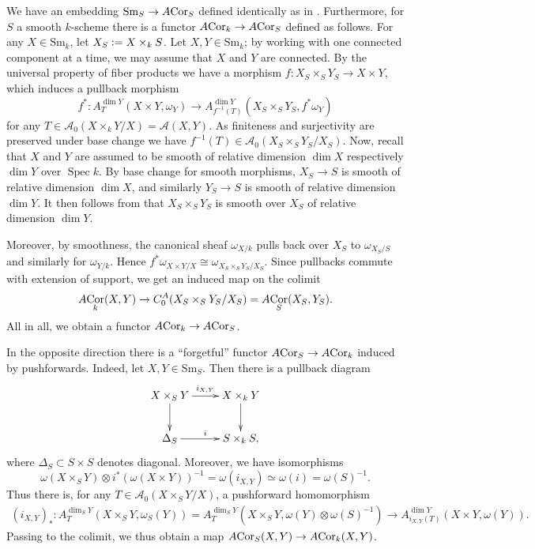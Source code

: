 \documentclass[a4paper, oneside, english,reqno]{amsart}
\theoremstyle{plain}
\theoremstyle{definition}
\theoremstyle{remark}
\newcommand{\defeq}{\vcentcolon=}
\newcommand{\ACor}{A\mkern-3mu\Cor}
\newcommand{\calA}{\mathcal{A}}
\newcommand{\Sm}{\mathrm{Sm}}
\DeclareMathOperator{\Spec}{Spec}
\DeclareMathOperator{\Cor}{Cor}
\begin{document}
We have an embedding $\Sm_S\to \ACor_S$ defined identically as in \cite{Calmes-Fasel}. Furthermore, for $S$ a smooth $k$-scheme there is a functor $\ACor_k\to \ACor_S$ defined as follows. For any $X\in\Sm_k$, let $X_S\defeq X\times_k S$. Let $X,Y\in\Sm_k$; by working with one connected component at a time, we may assume that $X$ and $Y$ are connected. By the universal property of fiber products we have a morphism $f\colon X_S\times_S Y_S\to X\times Y$, which induces a pullback morphism
\[
f^*\colon A_T^{\dim Y}(X\times Y,\omega_{Y})\to A_{f^{-1}(T)}^{\dim Y}(X_S\times_S Y_S,f^*\omega_{Y})
\]for any $T\in\calA_0(X\times_k Y/X)=\calA(X,Y)$. As finiteness and surjectivity are preserved under base change we have $f^{-1}(T)\in\calA_0(X_S\times_S Y_S/X_S)$. Now, recall that $X$ and $Y$ are assumed to be smooth of relative dimension $\dim X$ respectively $\dim Y$ over $\Spec k$. By base change for smooth morphisms, $X_S\to S$ is smooth of relative dimension $\dim X$, and similarly $Y_S\to S$ is smooth of relative dimension $\dim Y$. It then follows from \cite[III Proposition 10.1]{Hartshorne} that $X_S\times_S Y_S$ is smooth over $X_S$ of relative dimension $\dim Y$.

Moreover, by smoothness, the canonical sheaf $\omega_{X/k}$ pulls back over $X_S$ to $\omega_{X_S/S}$ and similarly for $\omega_{Y/k}$. Hence $f^*\omega_{X\times Y/X}\cong\omega_{X_S\times_S Y_S/X_S}$. Since pullbacks commute with extension of support, we get an induced map on the colimit
\[
\ACor_k(X,Y)\to C^A_0(X_S\times_S Y_S/X_S)=\ACor_S(X_S,Y_S).
\]
All in all, we obtain a functor $\ACor_k\to \ACor_S$.


In the opposite direction there is a ``forgetful'' functor $\ACor_S\to \ACor_k$ induced by pushforwards.
Indeed, let $X,Y\in \Sm_S$. 
Then there is a pullback diagram
$$\xymatrix{
X\times_S Y \ar[r]^{i_{X,Y}}\ar[d] & X\times_k Y\ar[d]\\
\Delta_S \ar[r]^i & S\times_k S
,}$$
where $\Delta_S\subset S\times S$ denotes diagonal. Moreover, we have isomorphisms
\[\omega(X\times_S Y)\otimes i^*(\omega(X\times Y))^{-1}= \omega(i_{X,Y}) \simeq \omega(i) = \omega(S)^{-1}.\]
Thus there is, for any $T\in\calA_0(X\times_SY/X)$, a pushforward homomorphism 
\begin{align*}
(i_{X,Y})_*\colon A^{\dim_S Y}_{T}(X\times_S Y,\omega_S (Y))=A^{\dim_S Y}_T(X\times_S Y,\omega(Y)\otimes \omega(S)^{-1})\to 
A^{\dim Y}_{i_{X,Y}(T)}(X\times Y, \omega(Y) ).
\end{align*}
Passing to the colimit, we thus obtain a map $\ACor_S(X,Y)\to\ACor_k(X,Y)$.
\end{document}
